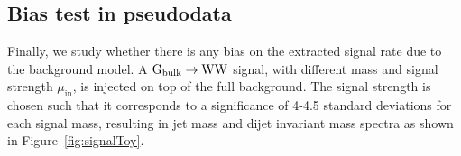 
\subsection{Bias test in pseudodata}
\label{sec:bias}
Finally, we study whether there is any bias on the extracted signal rate due to the background model. A $\mathrm{G}_\mathrm{bulk} \rightarrow\mathrm{W}\mathrm{W}$ signal, with different mass and signal strength $\mu_\mathrm{in}$, is injected on top of the full background. The signal strength is chosen such that it corresponds to a significance of 4-4.5 standard deviations for each signal mass, resulting in jet mass and dijet invariant mass spectra as shown in Figure~\ref{fig:signalToy}.
